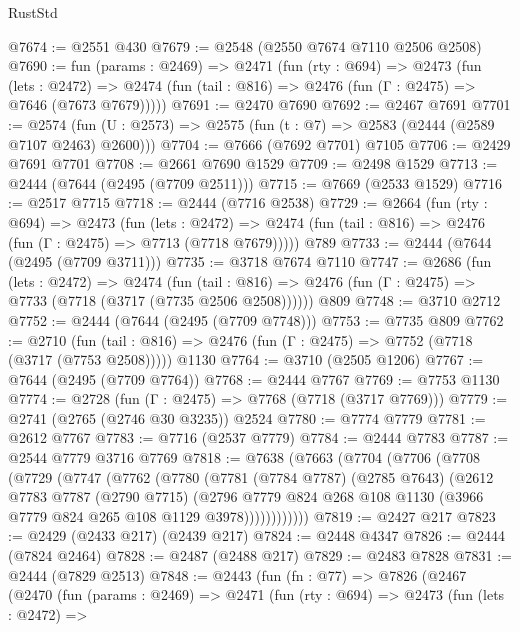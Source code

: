 \begin{lexlean}{RustStd}
\begin{coremodule}
@7674 := @2551 @430
@7679 := @2548 (@2550 @7674 @7110 @2506 @2508)
@7690 := fun (params : @2469) =>
  @2471
    (fun (rty : @694) =>
    @2473
      (fun (lets : @2472) =>
      @2474 (fun (tail : @816) => @2476 (fun (Γ : @2475) => @7646 (@7673 @7679)))))
@7691 := @2470 @7690
@7692 := @2467 @7691
@7701 := @2574 (fun (U : @2573) => @2575 (fun (t : @7) => @2583 (@2444 (@2589 @7107 @2463) @2600)))
@7704 := @7666 (@7692 @7701) @7105
@7706 := @2429 @7691 @7701
@7708 := @2661 @7690 @1529
@7709 := @2498 @1529
@7713 := @2444 (@7644 (@2495 (@7709 @2511)))
@7715 := @7669 (@2533 @1529)
@7716 := @2517 @7715
@7718 := @2444 (@7716 @2538)
@7729 := @2664
    (fun (rty : @694) =>
    @2473
      (fun (lets : @2472) =>
      @2474 (fun (tail : @816) => @2476 (fun (Γ : @2475) => @7713 (@7718 @7679)))))
    @789
@7733 := @2444 (@7644 (@2495 (@7709 @3711)))
@7735 := @3718 @7674 @7110
@7747 := @2686
    (fun (lets : @2472) =>
    @2474
      (fun (tail : @816) => @2476 (fun (Γ : @2475) => @7733 (@7718 (@3717 (@7735 @2506 @2508))))))
    @809
@7748 := @3710 @2712
@7752 := @2444 (@7644 (@2495 (@7709 @7748)))
@7753 := @7735 @809
@7762 := @2710
    (fun (tail : @816) => @2476 (fun (Γ : @2475) => @7752 (@7718 (@3717 (@7753 @2508)))))
    @1130
@7764 := @3710 (@2505 @1206)
@7767 := @7644 (@2495 (@7709 @7764))
@7768 := @2444 @7767
@7769 := @7753 @1130
@7774 := @2728 (fun (Γ : @2475) => @7768 (@7718 (@3717 @7769)))
@7779 := @2741 (@2765 (@2746 @30 @3235)) @2524
@7780 := @7774 @7779
@7781 := @2612 @7767
@7783 := @7716 (@2537 @7779)
@7784 := @2444 @7783
@7787 := @2544 @7779 @3716 @7769
@7818 := @7638
    (@7663
      (@7704
        (@7706
          (@7708
            (@7729
              (@7747
                (@7762
                  (@7780
                    (@7781
                      (@7784 @7787)
                      (@2785 @7643)
                      (@2612
                        @7783
                        @7787
                        (@2790 @7715)
                        (@2796
                          @7779
                          @824
                          @268
                          @108
                          @1130
                          (@3966 @7779 @824 @265 @108 @1129 @3978))))))))))))
@7819 := @2427 @217
@7823 := @2429 (@2433 @217) (@2439 @217)
@7824 := @2448 @4347
@7826 := @2444 (@7824 @2464)
@7828 := @2487 (@2488 @217)
@7829 := @2483 @7828
@7831 := @2444 (@7829 @2513)
@7848 := @2443
    (fun (fn : @77) =>
    @7826
      (@2467
        (@2470
          (fun (params : @2469) =>
          @2471
            (fun (rty : @694) =>
            @2473
              (fun (lets : @2472) =>

\end{coremodule}
\end{lexlean}
